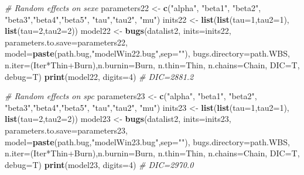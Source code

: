 \documentclass[]{article}
\newenvironment{Shaded}{\begin{snugshade}}{\end{snugshade}}
\newcommand{\KeywordTok}[1]{\textcolor[rgb]{0.13,0.29,0.53}{\textbf{{#1}}}}
\newcommand{\DataTypeTok}[1]{\textcolor[rgb]{0.13,0.29,0.53}{{#1}}}
\newcommand{\DecValTok}[1]{\textcolor[rgb]{0.00,0.00,0.81}{{#1}}}
\newcommand{\StringTok}[1]{\textcolor[rgb]{0.31,0.60,0.02}{{#1}}}
\newcommand{\CommentTok}[1]{\textcolor[rgb]{0.56,0.35,0.01}{\textit{{#1}}}}
\newcommand{\NormalTok}[1]{{#1}}
\begin{document}
\begin{Shaded}
\begin{Highlighting}[]
{{\CommentTok{# Random effects on sexe}
\NormalTok{parameters22 <-}\StringTok{ }\KeywordTok{c}\NormalTok{(}\StringTok{"alpha"}\NormalTok{, }\StringTok{"beta1"}\NormalTok{, }\StringTok{"beta2"}\NormalTok{, }\StringTok{"beta3"}\NormalTok{,}\StringTok{"beta4"}\NormalTok{,}\StringTok{"beta5"}\NormalTok{, }\StringTok{"tau"}\NormalTok{,}\StringTok{"tau2"}\NormalTok{, }\StringTok{"mu"}\NormalTok{)}
\NormalTok{inits22 <-}\StringTok{ }\KeywordTok{list}\NormalTok{(}\KeywordTok{list}\NormalTok{(}\DataTypeTok{tau=}\DecValTok{1}\NormalTok{,}\DataTypeTok{tau2=}\DecValTok{1}\NormalTok{), }\KeywordTok{list}\NormalTok{(}\DataTypeTok{tau=}\DecValTok{2}\NormalTok{,}\DataTypeTok{tau2=}\DecValTok{2}\NormalTok{))}
\NormalTok{model22 <-}\StringTok{ }\KeywordTok{bugs}\NormalTok{(datalist2, }\DataTypeTok{inits=}\NormalTok{inits22, }\DataTypeTok{parameters.to.save=}\NormalTok{parameters22,}
               \DataTypeTok{model=}\KeywordTok{paste}\NormalTok{(path.bug,}\StringTok{"modelWin22.bug"}\NormalTok{,}\DataTypeTok{sep=}\StringTok{""}\NormalTok{),}
               \DataTypeTok{bugs.directory=}\NormalTok{path.WBS,               }
               \DataTypeTok{n.iter=}\NormalTok{(Iter*Thin+Burn),}\DataTypeTok{n.burnin=}\NormalTok{Burn, }\DataTypeTok{n.thin=}\NormalTok{Thin, }\DataTypeTok{n.chains=}\NormalTok{Chain, }\DataTypeTok{DIC=}\NormalTok{T, }\DataTypeTok{debug=}\NormalTok{T)}
\KeywordTok{print}\NormalTok{(model22, }\DataTypeTok{digits=}\DecValTok{4}\NormalTok{) }
\CommentTok{# DIC=2881.2}

\CommentTok{# Random effects on spc}
\NormalTok{parameters23 <-}\StringTok{ }\KeywordTok{c}\NormalTok{(}\StringTok{"alpha"}\NormalTok{, }\StringTok{"beta1"}\NormalTok{, }\StringTok{"beta2"}\NormalTok{, }\StringTok{"beta3"}\NormalTok{,}\StringTok{"beta4"}\NormalTok{,}\StringTok{"beta5"}\NormalTok{, }\StringTok{"tau"}\NormalTok{,}\StringTok{"tau2"}\NormalTok{, }\StringTok{"mu"}\NormalTok{)}
\NormalTok{inits23 <-}\StringTok{ }\KeywordTok{list}\NormalTok{(}\KeywordTok{list}\NormalTok{(}\DataTypeTok{tau=}\DecValTok{1}\NormalTok{,}\DataTypeTok{tau2=}\DecValTok{1}\NormalTok{), }\KeywordTok{list}\NormalTok{(}\DataTypeTok{tau=}\DecValTok{2}\NormalTok{,}\DataTypeTok{tau2=}\DecValTok{2}\NormalTok{))}
\NormalTok{model23 <-}\StringTok{ }\KeywordTok{bugs}\NormalTok{(datalist2, }\DataTypeTok{inits=}\NormalTok{inits23, }\DataTypeTok{parameters.to.save=}\NormalTok{parameters23,}
               \DataTypeTok{model=}\KeywordTok{paste}\NormalTok{(path.bug,}\StringTok{"modelWin23.bug"}\NormalTok{,}\DataTypeTok{sep=}\StringTok{""}\NormalTok{),}
               \DataTypeTok{bugs.directory=}\NormalTok{path.WBS,               }
               \DataTypeTok{n.iter=}\NormalTok{(Iter*Thin+Burn),}\DataTypeTok{n.burnin=}\NormalTok{Burn, }\DataTypeTok{n.thin=}\NormalTok{Thin, }\DataTypeTok{n.chains=}\NormalTok{Chain, }\DataTypeTok{DIC=}\NormalTok{T, }\DataTypeTok{debug=}\NormalTok{T)}
\KeywordTok{print}\NormalTok{(model23, }\DataTypeTok{digits=}\DecValTok{4}\NormalTok{)}
\CommentTok{# DIC=2970.0}

}}
\end{Highlighting}
\end{Shaded}
\end{document}
